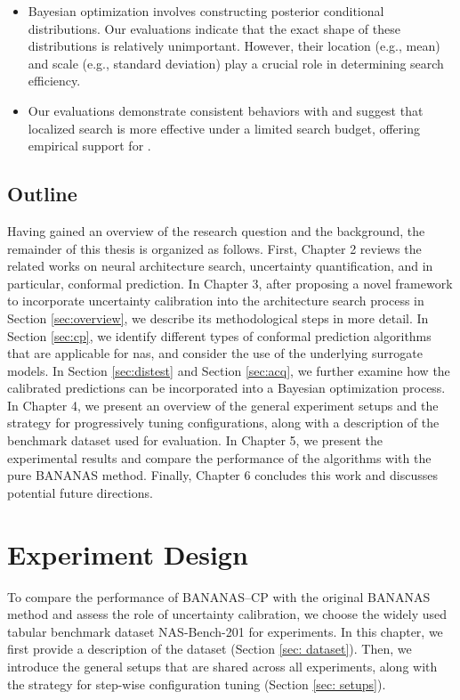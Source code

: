 \documentclass[a4paper,oneside,bibliography=totoc]{scrbook}
\begin{document}
	\begin{itemize}
    \item Bayesian optimization involves constructing posterior conditional distributions. Our evaluations indicate that the exact shape of these distributions is relatively unimportant. However, their location (e.g., mean) and scale (e.g., standard deviation) play a crucial role in determining search efficiency. 
    \item Our evaluations demonstrate consistent behaviors with \cite{white2019bananas} and suggest that localized search is more effective under a limited search budget, offering empirical support for \cite{nomura2019simple}. 
    \end{itemize}

\section{Outline}
Having gained an overview of the research question and the background, the remainder of this thesis is organized as follows. First, Chapter 2 reviews the related works on neural architecture search, uncertainty quantification, and in particular, conformal prediction. In Chapter 3, after proposing a novel framework to incorporate uncertainty calibration into the architecture search process in Section \ref{sec:overview}, we describe its methodological steps in more detail. In Section \ref{sec:cp}, we identify different types of conformal prediction algorithms that are applicable for \gls{nas}, and consider the use of the underlying surrogate models. In Section \ref{sec:distest} and Section \ref{sec:acq}, we further examine how the calibrated predictions can be incorporated into a Bayesian optimization process. In Chapter 4, we present an overview of the general experiment setups and the strategy for progressively tuning configurations, along with a description of the benchmark dataset used for evaluation. In Chapter 5, we present the experimental results and compare the performance of the algorithms with the pure BANANAS method. Finally, Chapter 6 concludes this work and discusses potential future directions.  





\chapter{Experiment Design}
\label{ch4}
To compare the performance of BANANAS--CP with the original BANANAS method and assess the role of uncertainty calibration, we choose the widely used tabular benchmark dataset NAS-Bench-201 \cite{dong2020nasbench201} for experiments. In this chapter, we first provide a description of the dataset (Section \ref{sec: dataset}). Then, we introduce the general setups that are shared across all experiments, along with the strategy for step-wise configuration tuning  (Section \ref{sec: setups}).
\end{document}

